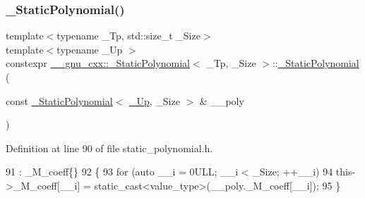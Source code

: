 \mbox{\label{class____gnu__cxx_1_1__StaticPolynomial_aaa12a167629e41db9d0964a39b657b6c}} 
\subsubsection{\texorpdfstring{\+\_\+\+Static\+Polynomial()}{\_StaticPolynomial()}\hspace{0.1cm}{\footnotesize\ttfamily [4/8]}}
{\footnotesize\ttfamily template$<$typename \+\_\+\+Tp, std\+::size\+\_\+t \+\_\+\+Size$>$ \\
template$<$typename \+\_\+\+Up $>$ \\
constexpr \hyperlink{class____gnu__cxx_1_1__StaticPolynomial}{\+\_\+\+\_\+gnu\+\_\+cxx\+::\+\_\+\+Static\+Polynomial}$<$ \+\_\+\+Tp, \+\_\+\+Size $>$\+::\hyperlink{class____gnu__cxx_1_1__StaticPolynomial}{\+\_\+\+Static\+Polynomial} (\begin{DoxyParamCaption}\item[{const \hyperlink{class____gnu__cxx_1_1__StaticPolynomial}{\+\_\+\+Static\+Polynomial}$<$ \hyperlink{namespace____gnu__cxx_ab693ea357b6429b331e0bf09f9442385}{\+\_\+\+Up}, \+\_\+\+Size $>$ \&}]{\+\_\+\+\_\+poly }\end{DoxyParamCaption})\hspace{0.3cm}{\ttfamily [inline]}}



Definition at line 90 of file static\+\_\+polynomial.\+h.


\begin{DoxyCode}
91         : \_M\_coeff\{\}
92         \{
93           \textcolor{keywordflow}{for} (\textcolor{keyword}{auto} \_\_i = 0ULL; \_\_i < \_Size; ++\_\_i)
94             this->\_M\_coeff[\_\_i] = static\_cast<value\_type>(\_\_poly.\_M\_coeff[\_\_i]);
95         \}
\end{DoxyCode}
\mbox{\label{class____gnu__cxx_1_1__StaticPolynomial_ae7040aa4ca84a8af3d9c7ab15eb79ab3}} 
